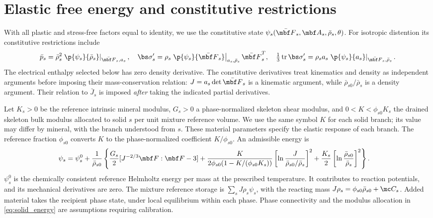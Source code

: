 \documentclass[11pt]{article}
\begin{document}
\section{Elastic free energy and constitutive restrictions}
With all plastic and stress-free factors equal to identity, we use the constitutive state
\(\psi_s(\bar{\mbf F}_s,\mbf A_s,\bar\rho_s,\theta)\).
For isotropic distention its constitutive restrictions include
\begin{equation}
 \bar p_s=\bar\rho_s^2\left.\p{\psi_s}{\bar\rho_s}\right|_{\bar{\mbf F}_s,a_s},
 \quad \bs\sigma_s'=\rho_s\left.\p{\psi_s}{\bar{\mbf F}_s}\right|_{a_s,\bar\rho_s}\bar{\mbf F}_s^T,
 \quad \tfrac13\operatorname{tr}\bs\sigma_s'=\rho_s a_s\left.\p{\psi_s}{a_s}\right|_{\bar{\mbf F}_s,\bar\rho_s}.
 \label{eq:solid_restrictions}
\end{equation}
The electrical enthalpy selected below has zero density derivative. The constitutive derivatives treat kinematics and density as independent arguments before imposing their mass-conservation relation: \(J=a_s\det\bar{\mbf F}_s\) is a kinematic argument, while \(\bar\rho_{s0}/\bar\rho_s\) is a density argument. Their relation to \(\bar J_s\) is imposed \emph{after} taking the indicated partial derivatives.

Let \(K_s>0\) be the reference intrinsic mineral modulus, \(G_s>0\) a phase-normalized skeleton shear modulus, and \(0<K<\phi_{s0}K_s\) the drained skeleton bulk modulus allocated to solid \(s\) per unit mixture reference volume. We use the same symbol \(K\) for each solid branch; its value may differ by mineral, with the branch understood from \(s\). These material parameters specify the elastic response of each branch. The reference fraction \(\phi_{s0}\) converts \(K\) to the phase-normalized coefficient \(K/\phi_{s0}\). An admissible energy is
\begin{align}
 \psi_s={}&\psi_s^0+\frac1{\bar\rho_{s0}}\left\{
 \frac{G_s}{2}[J^{-2/3}\mbf F:\mbf F-3]
 +\frac{K}{2\phi_{s0}(1-K/(\phi_{s0}K_s))}\left[\ln\frac{J}{\bar\rho_{s0}/\bar\rho_s}\right]^2
 +\frac{K_s}2\left[\ln\frac{\bar\rho_{s0}}{\bar\rho_s}\right]^2\right\}.
 \label{eq:solid_energy}
\end{align}
\(\psi_s^0\) is the chemically consistent reference Helmholtz energy per mass at the prescribed temperature. It contributes to reaction potentials, and its mechanical derivatives are zero. The mixture reference storage is \(\sum_sJ\rho_s\psi_s\), with the reacting mass \(J\rho_s=\phi_{s0}\bar\rho_{s0}+\mc C_s\). Added material takes the recipient phase state, under local equilibrium within each phase. Phase connectivity and the modulus allocation in \eqref{eq:solid_energy} are assumptions requiring calibration.
\end{document}
